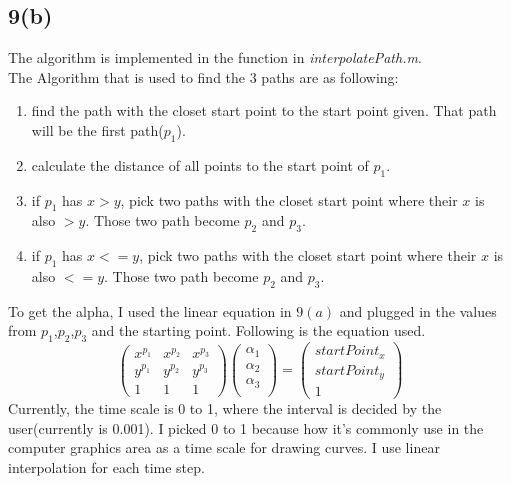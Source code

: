 \documentclass{article}
\begin{document}
\subsection*{9(b)}
The algorithm is implemented in the function in \textit{interpolatePath.m}.\\
The Algorithm that is used to find the 3 paths are as following:
\begin{enumerate}
	\item find the path with the closet start point to the start point given. That path will be the first path($p_1$).
	\item calculate the distance of all points to the start point of $p_1$.
	\item if $p_1$ has $x > y$, pick two paths with the closet start point where their $x$ is also $> y$. Those two path become $p_2$ and $p_3$. 
	\item if $p_1$ has $x <= y$, pick two paths with the closet start point where their $x$ is also $<= y$. Those two path become $p_2$ and $p_3$. 
\end{enumerate}
To get the alpha, I used the linear equation in $9(a)$ and plugged in the values from $p_1$,$p_2$,$p_3$ and the starting point. Following is the equation used.
\begin{equation*}
\begin{pmatrix}
x^{p_1} & x^{p_2} & x^{p_3} \\
y^{p_1} & y^{p_2} & y^{p_3} \\
1 & 1 & 1 
\end{pmatrix}
\begin{pmatrix}
\alpha_1 \\
\alpha_2 \\
\alpha_3 \\ 
\end{pmatrix}
=
\begin{pmatrix}
startPoint_x \\
startPoint_y \\
1 
\end{pmatrix}
\end{equation*}
Currently, the time scale is 0 to 1, where the interval is decided by the user(currently is 0.001). I picked 0 to 1 because how it's commonly use in the computer graphics area as a time scale for drawing curves. I use linear interpolation for each time step.
\end{document}
